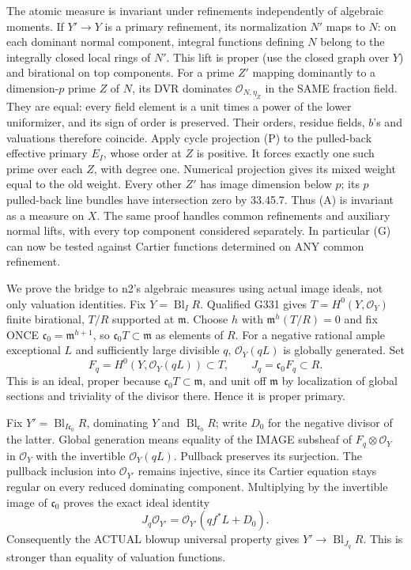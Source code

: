 \documentclass[11pt]{article}
\begin{document}
The atomic measure is invariant under refinements independently of algebraic moments. If \(Y'\to Y\) is a primary refinement, its normalization \(N'\) maps to \(N\): on each dominant normal component, integral functions defining \(N\) belong to the integrally closed local rings of \(N'\). This lift is proper (use the closed graph over \(Y\)) and birational on top components. For a prime \(Z'\) mapping dominantly to a dimension-\(p\) prime \(Z\) of \(N\), its DVR dominates \(\mathcal O_{N,\eta_Z}\) in the SAME fraction field. They are equal: every field element is a unit times a power of the lower uniformizer, and its sign of order is preserved. Their orders, residue fields, \(b\)'s and valuations therefore coincide. Apply cycle projection (P) to the pulled-back effective primary \(E_I\), whose order at \(Z\) is positive. It forces exactly one such prime over each \(Z\), with degree one. Numerical projection gives its mixed weight equal to the old weight. Every other \(Z'\) has image dimension below \(p\); its \(p\) pulled-back line bundles have intersection zero by 33.45.7. Thus (A) is invariant as a measure on \(X\). The same proof handles common refinements and auxiliary normal lifts, with every top component considered separately. In particular (G) can now be tested against Cartier functions determined on ANY common refinement.

We prove the bridge to n2's algebraic measures using actual image ideals, not only valuation identities. Fix \(Y=\operatorname{Bl}_I R\). Qualified G331 gives \(T=H^0(Y,\mathcal O_Y)\) finite birational, \(T/R\) supported at \(\mathfrak m\). Choose \(h\) with \(\mathfrak m^h(T/R)=0\) and fix ONCE
\(\mathfrak c_0=\mathfrak m^{h+1}\), so \(\mathfrak c_0T\subset\mathfrak m\) as elements of \(R\). For a negative rational ample exceptional \(L\) and sufficiently large divisible \(q\), \(\mathcal O_Y(qL)\) is globally generated. Set
\[
F_q=H^0(Y,\mathcal O_Y(qL))\subset T,\qquad J_q=\mathfrak c_0F_q\subset R.
\]
This is an ideal, proper because \(\mathfrak c_0T\subset\mathfrak m\), and unit off \(\mathfrak m\) by localization of global sections and triviality of the divisor there. Hence it is proper primary.

Fix \(Y'=\operatorname{Bl}_{I\mathfrak c_0}R\), dominating \(Y\) and \(\operatorname{Bl}_{\mathfrak c_0}R\); write \(D_0\) for the negative divisor of the latter. Global generation means equality of the IMAGE subsheaf of \(F_q\otimes\mathcal O_Y\) in \(\mathcal O_Y\) with the invertible \(\mathcal O_Y(qL)\). Pullback preserves its surjection. The pullback inclusion into \(\mathcal O_{Y'}\) remains injective, since its Cartier equation stays regular on every reduced dominating component. Multiplying by the invertible image of \(\mathfrak c_0\) proves the exact ideal identity
\[
J_q\mathcal O_{Y'}=\mathcal O_{Y'}(qf^*L+D_0). \tag{S}
\]
Consequently the ACTUAL blowup universal property gives \(Y'\to\operatorname{Bl}_{J_q}R\). This is stronger than equality of valuation functions.
\end{document}
